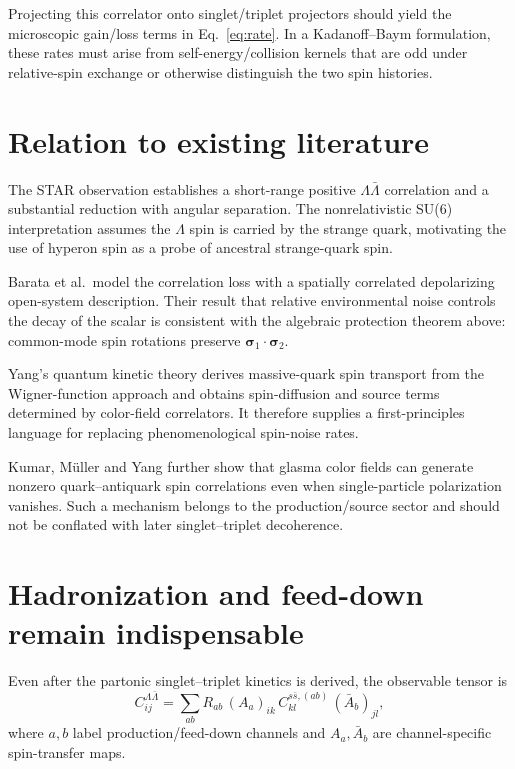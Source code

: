 \documentclass[11pt]{article}
\begin{document}
Projecting this correlator onto singlet/triplet projectors should yield the microscopic gain/loss
terms in Eq.~\eqref{eq:rate}. In a Kadanoff--Baym formulation, these rates must arise from
self-energy/collision kernels that are odd under relative-spin exchange or otherwise distinguish the
two spin histories.

\section{Relation to existing literature}

The STAR observation establishes a short-range positive $\Lambda\bar\Lambda$ correlation and a
substantial reduction with angular separation. The nonrelativistic SU(6) interpretation assumes the
$\Lambda$ spin is carried by the strange quark, motivating the use of hyperon spin as a probe of
ancestral strange-quark spin.

Barata et al.\ model the correlation loss with a spatially correlated depolarizing open-system
description. Their result that relative environmental noise controls the decay of the scalar is
consistent with the algebraic protection theorem above: common-mode spin rotations preserve
$\bm\sigma_1\cdot\bm\sigma_2$.

Yang's quantum kinetic theory derives massive-quark spin transport from the Wigner-function approach
and obtains spin-diffusion and source terms determined by color-field correlators. It therefore
supplies a first-principles language for replacing phenomenological spin-noise rates.

Kumar, M\"uller and Yang further show that glasma color fields can generate nonzero
quark--antiquark spin correlations even when single-particle polarization vanishes. Such a mechanism
belongs to the production/source sector and should not be conflated with later singlet--triplet
decoherence.

\section{Hadronization and feed-down remain indispensable}

Even after the partonic singlet--triplet kinetics is derived, the observable tensor is
\begin{equation}
C^{\Lambda\bar\Lambda}_{ij}
=
\sum_{ab}
R_{ab}\,
(A_a)_{ik}\,
C^{s\bar s,(ab)}_{kl}\,
(\bar A_b)_{jl},
\label{eq:feed}
\end{equation}
where $a,b$ label production/feed-down channels and $A_a,\bar A_b$ are channel-specific spin-transfer
maps.
\end{document}
